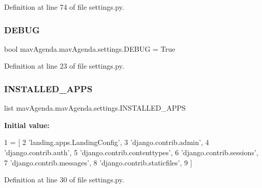 Definition at line 74 of file settings.\+py.

\mbox{\label{namespacemavAgenda_1_1mavAgenda_1_1settings_a074f2dc4c13952db560d3f41d8a90809}} 
\subsubsection{\texorpdfstring{D\+E\+B\+UG}{DEBUG}}
{\footnotesize\ttfamily bool mav\+Agenda.\+mav\+Agenda.\+settings.\+D\+E\+B\+UG = True}



Definition at line 23 of file settings.\+py.

\mbox{\label{namespacemavAgenda_1_1mavAgenda_1_1settings_abef116c8f28b211dcef5b323688ede86}} 
\subsubsection{\texorpdfstring{I\+N\+S\+T\+A\+L\+L\+E\+D\+\_\+\+A\+P\+PS}{INSTALLED\_APPS}}
{\footnotesize\ttfamily list mav\+Agenda.\+mav\+Agenda.\+settings.\+I\+N\+S\+T\+A\+L\+L\+E\+D\+\_\+\+A\+P\+PS}

{\bfseries Initial value\+:}
\begin{DoxyCode}
1 =  [
2     \textcolor{stringliteral}{'landing.apps.LandingConfig'},
3     \textcolor{stringliteral}{'django.contrib.admin'},
4     \textcolor{stringliteral}{'django.contrib.auth'},
5     \textcolor{stringliteral}{'django.contrib.contenttypes'},
6     \textcolor{stringliteral}{'django.contrib.sessions'},
7     \textcolor{stringliteral}{'django.contrib.messages'},
8     \textcolor{stringliteral}{'django.contrib.staticfiles'},
9 ]
\end{DoxyCode}


Definition at line 30 of file settings.\+py.

